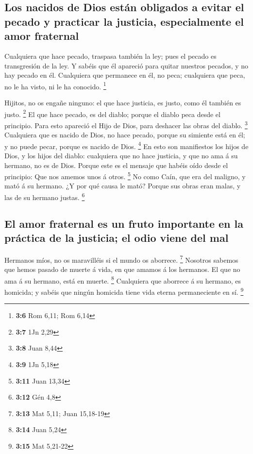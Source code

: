 \hypertarget{los-nacidos-de-dios-estuxe1n-obligados-a-evitar-el-pecado-y-practicar-la-justicia-especialmente-el-amor-fraternal}{%
\subsection{Los nacidos de Dios están obligados a evitar el pecado y
practicar la justicia, especialmente el amor
fraternal}\label{los-nacidos-de-dios-estuxe1n-obligados-a-evitar-el-pecado-y-practicar-la-justicia-especialmente-el-amor-fraternal}}

 Cualquiera que hace pecado, traspasa también la ley; pues
el pecado es transgresión de la ley.  Y sabéis que él
apareció para quitar nuestros pecados, y no hay pecado en él.
 Cualquiera que permanece en él, no peca; cualquiera que
peca, no le ha visto, ni le ha conocido. \footnote{\textbf{3:6} Rom
  6,11; Rom 6,14}

 Hijitos, no os engañe ninguno: el que hace justicia, es
justo, como él también es justo. \footnote{\textbf{3:7} 1Jn 2,29}
 El que hace pecado, es del diablo; porque el diablo peca
desde el principio. Para esto apareció el Hijo de Dios, para deshacer
las obras del diablo. \footnote{\textbf{3:8} Juan 8,44} 
Cualquiera que es nacido de Dios, no hace pecado, porque su simiente
está en él; y no puede pecar, porque es nacido de Dios. \footnote{\textbf{3:9}
  1Jn 5,18}  En esto son manifiestos los hijos de Dios, y
los hijos del diablo: cualquiera que no hace justicia, y que no ama á su
hermano, no es de Dios.  Porque este es el mensaje que
habéis oído desde el principio: Que nos amemos unos á otros. \footnote{\textbf{3:11}
  Juan 13,34}  No como Caín, que era del maligno, y mató á
su hermano. ¿Y por qué causa le mató? Porque sus obras eran malas, y las
de su hermano justas. \footnote{\textbf{3:12} Gén 4,8}

\hypertarget{el-amor-fraternal-es-un-fruto-importante-en-la-pruxe1ctica-de-la-justicia-el-odio-viene-del-mal}{%
\subsection{El amor fraternal es un fruto importante en la práctica de
la justicia; el odio viene del
mal}\label{el-amor-fraternal-es-un-fruto-importante-en-la-pruxe1ctica-de-la-justicia-el-odio-viene-del-mal}}

 Hermanos míos, no os maravilléis si el mundo os aborrece.
\footnote{\textbf{3:13} Mat 5,11; Juan 15,18-19}  Nosotros
sabemos que hemos pasado de muerte á vida, en que amamos á los hermanos.
El que no ama á su hermano, está en muerte. \footnote{\textbf{3:14} Juan
  5,24}  Cualquiera que aborrece á su hermano, es homicida;
y sabéis que ningún homicida tiene vida eterna permaneciente en sí.
\footnote{\textbf{3:15} Mat 5,21-22}

